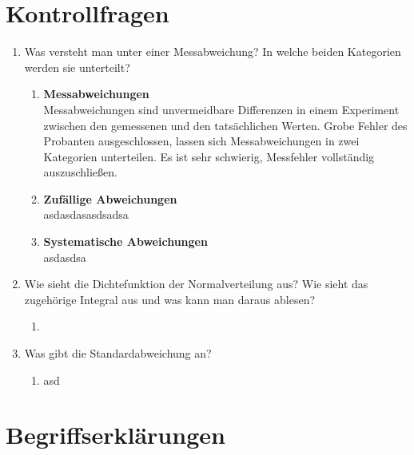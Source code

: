 \documentclass[fleqn,10pt]{olplainarticle}
\begin{document}
\section{Kontrollfragen}
 \begin{enumerate}
     \item Was versteht man unter einer Messabweichung? In welche beiden Kategorien werden sie unterteilt?
    \begin{enumerate}
     \item \textbf{Messabweichungen} \cite{FATU} \\
    Messabweichungen sind unvermeidbare Differenzen in einem Experiment zwischen den gemessenen und den tatsächlichen Werten. Grobe Fehler des Probanten ausgeschlossen, lassen sich Messabweichungen in zwei Kategorien unterteilen. Es ist sehr schwierig, Messfehler vollständig auszuschließen.
        \item \textbf{Zufällige Abweichungen} \cite{FATU} \\
        asdasdasasdsadsa
        \item \textbf{Systematische Abweichungen} \cite{FATU} \\
            asdasdsa
    \end{enumerate}
     \item Wie sieht die Dichtefunktion der Normalverteilung aus? Wie sieht das zugehörige Integral aus und was kann man daraus ablesen? 
     \begin{enumerate}
         \item 
     \end{enumerate}

     \item Was gibt die Standardabweichung an?  
     \begin{enumerate}
         \item asd
     \end{enumerate}
 \end{enumerate}

\section{Begriffserklärungen}



\end{document}
